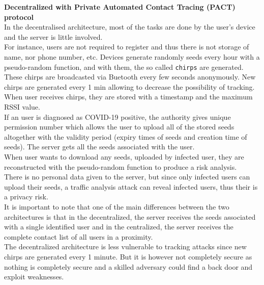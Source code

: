 \documentclass[a4paper, twocolumn]{article}
\begin{document}
\noindent \textbf{Decentralized with Private Automated Contact Tracing (PACT) protocol}\\
In the decentralised architecture, most of the tasks are done by the user's device and the server is little involved.\\
For instance, users are not required to register and thus there is not storage of name, nor phone number, etc. Devices generate randomly seeds every hour with a pseudo-random function, and with them, the so called \texttt{chirps} are generated. These chirps are broadcasted via Buetooth every few seconds anonymously. New chirps are generated every 1 min allowing to decrease the possibility of tracking. When user receives chirps, they are stored with a timestamp and the maximum RSSI value.\\
If an user is diagnosed as COVID-19 positive, the authority gives unique permission number which allows the user to upload all of the stored seeds altogether with the validity period (expiry times of seeds and creation time of seeds). The server gets all the seeds associated with the user.\\
When user wants to download any seeds, uploaded by infected user, they are reconstructed with the pseudo-random function to produce a risk analysis.\\

\noindent There is no personal data given to the server, but since only infected users can upload their seeds, a traffic analysis attack can reveal infected users, thus their is a privacy risk.\\
It is important to note that one of the main differences between the two architectures is that in the decentralized, the server receives the seeds associated with a single identified user and in the centralized, the server receives the complete contact list of all users in a proximity.\\
The decentralized architecture is less vulnerable to tracking attacks since new chirps are generated every 1 minute. But it is however not completely secure as nothing is completely secure and a skilled adversary could find a back door and exploit weaknesses.\\
\end{document}
